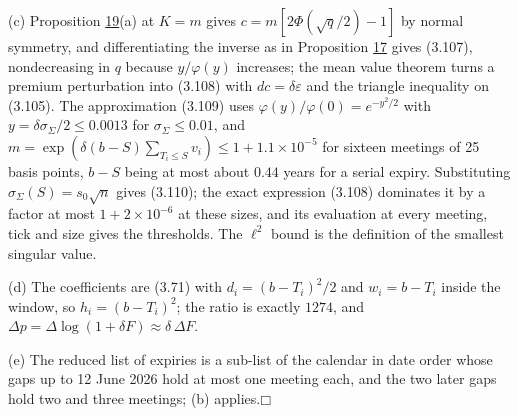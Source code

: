 \documentclass[11pt]{article}
\providecommand{\square}{\mdlgwhtsquare}
\begin{document}
(c) Proposition \hyperref[res:Proposition-19]{19}(a) at \(K = m\) gives \(c = m[2\Phi(\sqrt q/2) - 1]\) by normal symmetry, and differentiating the inverse as in Proposition \hyperref[res:Proposition-17]{17} gives (3.107), nondecreasing in \(q\) because \(y/\varphi(y)\) increases; the mean value theorem turns a premium perturbation into (3.108) with \(dc = \delta\varepsilon\) and the triangle inequality on (3.105). The approximation (3.109) uses \(\varphi(y)/\varphi(0) = e^{-y^2/2}\) with \(y = \delta\sigma_\Sigma/2 \le 0.0013\) for \(\sigma_\Sigma \le 0.01\), and \(m = \exp(\delta(b - S)\sum_{T_i \le S} v_i) \le 1 + 1.1 \times 10^{-5}\) for sixteen meetings of 25 basis points, \(b - S\) being at most about \(0.44\) years for a serial expiry. Substituting \(\sigma_\Sigma(S) = s_0\sqrt n\) gives (3.110); the exact expression (3.108) dominates it by a factor at most \(1 + 2 \times 10^{-6}\) at these sizes, and its evaluation at every meeting, tick and size gives the thresholds. The \(\ell^2\) bound is the definition of the smallest singular value.

(d) The coefficients are (3.71) with \(d_i = (b - T_i)^2/2\) and \(w_i = b - T_i\) inside the window, so \(h_i = (b - T_i)^2\); the ratio is exactly \(1274\), and \(\Delta p = \Delta \log(1 + \delta F) \approx \delta\,\Delta F\).

(e) The reduced list of expiries is a sub-list of the calendar in date order whose gaps up to 12 June 2026 hold at most one meeting each, and the two later gaps hold two and three meetings; (b) applies.\hfill$\square$
\end{document}
